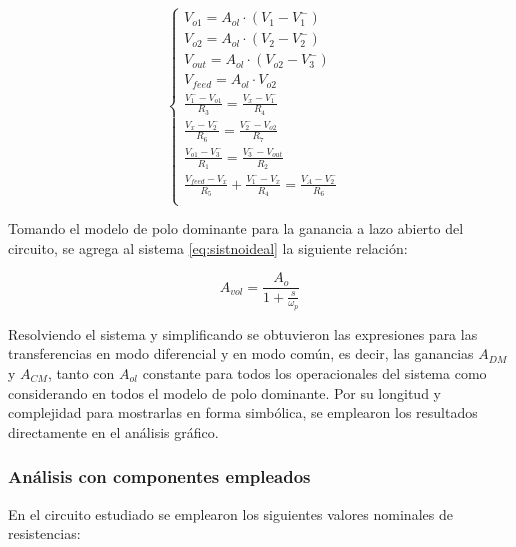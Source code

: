 \begin{equation}
    \left\{
        \begin{array}{lllllllll}
            
            V_{o1} =  A_{ol}\cdot (V_1-V_1^-)&\\
            
            V_{o2} = A_{ol}\cdot (V_2-V_2^-)\\
            
            V_{out} = A_{ol}\cdot (V_{o2}-V_3^-)\\
            
            V_{feed} = A_{ol}\cdot V_{o2}\\

            \frac{V_1^- - V_{o1}}{R_3} = \frac{V_x - V_1^-}{R_4}\\

            \frac{V_{x}-V_2^-}{R_6} = \frac{V_2^- - V_{o2}}{R_7}\\

            \frac{V_{o1}-V_3^-}{R_1} = \frac{V_3^- - V_{out}}{R_2}\\

            \frac{V_{feed}-V_x}{R_5} + \frac{V_1^- - V_x}{R_4}= \frac{V_A - V_2^-}{R_6}\\
        \end{array}
    \right.
\label{eq:sistnoideal}
\end{equation}

Tomando el modelo de polo dominante para la ganancia a lazo abierto del circuito, se agrega al sistema \ref{eq:sistnoideal} la siguiente relación:

$$A_{vol} = \frac{A_o}{1+\frac{s}{\omega_p}}$$

Resolviendo el sistema y simplificando se obtuvieron las expresiones para las transferencias en modo diferencial y en modo común, es decir, las ganancias $A_{DM}$ y $A_{CM}$, tanto con $A_{ol}$ constante para todos los operacionales del sistema como considerando en todos el modelo de polo dominante. Por su longitud y complejidad para mostrarlas en forma simbólica, se emplearon los resultados directamente en el análisis gráfico. 

\subsubsection{Análisis con componentes empleados}

En el circuito estudiado se emplearon los siguientes valores nominales de resistencias:


